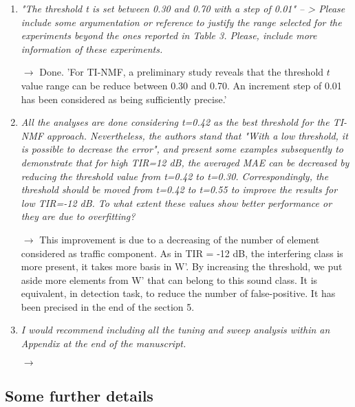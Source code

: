 \documentclass[10pt]{article}
\begin{document}
\begin{enumerate}
\item \emph{"The threshold t is set between 0.30 and 0.70 with a step of 0.01" -- > Please include some argumentation or reference to justify the range selected for the experiments beyond the ones reported in Table 3. Please, include more information of these experiments.}

$\rightarrow$ Done. 'For TI-NMF, a preliminary study reveals that the threshold $t$ value range can be reduce between  0.30 and 0.70. An increment step of 0.01 has been considered as being sufficiently precise.'

\item \emph{All the analyses are done considering t=0.42 as the best threshold for the TI-NMF approach. Nevertheless, the authors stand that "With a low threshold, it is possible to decrease the error", and present some examples subsequently to demonstrate that for high TIR=12 dB, the averaged MAE can be decreased by reducing the threshold value from t=0.42 to t=0.30. Correspondingly, the threshold should be moved from t=0.42 to t=0.55 to improve the results for low TIR=-12 dB. To what extent these values show better performance or they are due to overfitting?}

$\rightarrow$ This improvement is due to a decreasing of the number of element considered as traffic component. As in TIR = -12 dB, the interfering class is more present, it takes more basis in W'. By increasing the threshold, we put aside more elements from W' that can belong to this sound class. It is equivalent, in detection task, to reduce the number of false-positive. It has been precised in the end of the section 5.

\item \emph{I would recommend including all the tuning and sweep analysis within an Appendix at the end of the manuscript.}

$\rightarrow$ 

\end{enumerate}

\subsection{Some further details}
\end{document}
